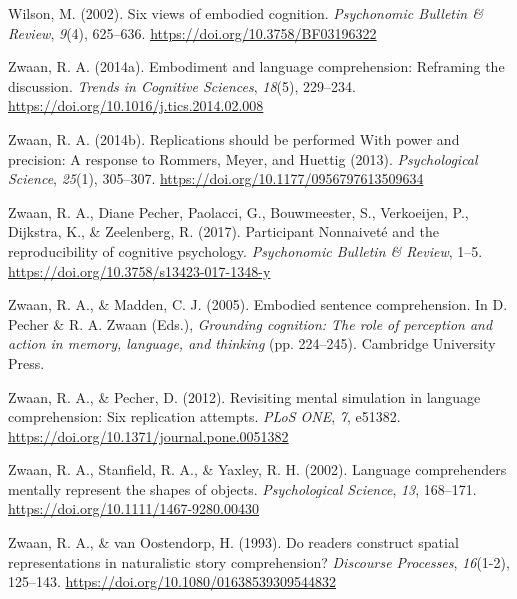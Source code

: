 \documentclass[
  man,floatsintext]{apa7}
\newlength{\cslhangindent}
\newlength{\cslentryspacingunit} %
\newenvironment{CSLReferences}[2] %
 {%
  \setlength{\parindent}{0pt}
  \ifodd #1
  \let\oldpar\par
  \def\par{\hangindent=\cslhangindent\oldpar}
  \fi
  \setlength{\parskip}{#2\cslentryspacingunit}
 }%
 {}
\begin{document}
\begin{CSLReferences}{1}{0}
\leavevmode{}%
Wilson, M. (2002). Six views of embodied cognition. \emph{Psychonomic Bulletin \& Review}, \emph{9}(4), 625--636. \url{https://doi.org/10.3758/BF03196322}

\leavevmode{}%
Zwaan, R. A. (2014a). Embodiment and language comprehension: Reframing the discussion. \emph{Trends in Cognitive Sciences}, \emph{18}(5), 229--234. \url{https://doi.org/10.1016/j.tics.2014.02.008}

\leavevmode{}%
Zwaan, R. A. (2014b). Replications {should be performed With power} and {precision}: {A response} to {Rommers}, {Meyer}, and {Huettig} (2013). \emph{Psychological Science}, \emph{25}(1), 305--307. \url{https://doi.org/10.1177/0956797613509634}

\leavevmode{}%
Zwaan, R. A., Diane Pecher, Paolacci, G., Bouwmeester, S., Verkoeijen, P., Dijkstra, K., \& Zeelenberg, R. (2017). Participant {Nonnaiveté} and the reproducibility of cognitive psychology. \emph{Psychonomic Bulletin \& Review}, 1--5. \url{https://doi.org/10.3758/s13423-017-1348-y}

\leavevmode{}%
Zwaan, R. A., \& Madden, C. J. (2005). Embodied sentence comprehension. In D. Pecher \& R. A. Zwaan (Eds.), \emph{Grounding cognition: {The} role of perception and action in memory, language, and thinking} (pp. 224--245). {Cambridge University Press}.

\leavevmode{}%
Zwaan, R. A., \& Pecher, D. (2012). Revisiting mental simulation in language comprehension: Six replication attempts. \emph{PLoS ONE}, \emph{7}, e51382. \url{https://doi.org/10.1371/journal.pone.0051382}

\leavevmode{}%
Zwaan, R. A., Stanfield, R. A., \& Yaxley, R. H. (2002). Language comprehenders mentally represent the shapes of objects. \emph{Psychological Science}, \emph{13}, 168--171. \url{https://doi.org/10.1111/1467-9280.00430}

\leavevmode{}%
Zwaan, R. A., \& van Oostendorp, H. (1993). Do readers construct spatial representations in naturalistic story comprehension? \emph{Discourse Processes}, \emph{16}(1-2), 125--143. \url{https://doi.org/10.1080/01638539309544832}

\end{CSLReferences}
\end{document}
